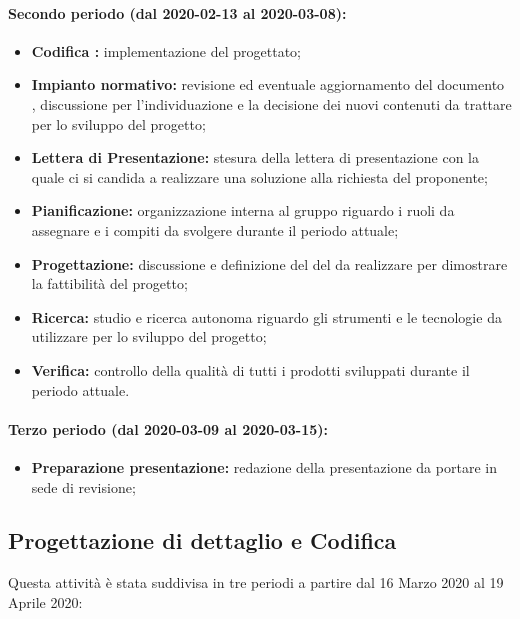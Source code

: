 			\paragraph{Secondo periodo (dal 2020-02-13 al 2020-03-08):}
				\begin{itemize}
					\item \textbf{Codifica :} implementazione del  progettato;
					\item \textbf{Impianto normativo:} revisione ed eventuale aggiornamento del documento , discussione per l'individuazione e la decisione dei nuovi contenuti da trattare per lo sviluppo del progetto;
					\item \textbf{Lettera di Presentazione:} stesura della lettera di presentazione con la quale ci si candida a realizzare una soluzione alla richiesta del proponente;
					\item \textbf{Pianificazione:} organizzazione interna al gruppo riguardo i ruoli da assegnare e i compiti da svolgere durante il periodo attuale;
					\item \textbf{Progettazione:} discussione e definizione del  del  da realizzare per dimostrare la fattibilità del progetto;
					\item \textbf{Ricerca:} studio e ricerca autonoma riguardo gli strumenti e le tecnologie da utilizzare per lo sviluppo del progetto;
					\item \textbf{Verifica:} controllo della qualità di tutti i prodotti sviluppati durante il periodo attuale.
				\end{itemize}
	
			\paragraph{Terzo periodo (dal 2020-03-09 al 2020-03-15):}
				\begin{itemize}
					\item \textbf{Preparazione presentazione:} redazione della presentazione da portare in sede di revisione;
				\end{itemize}

	\subsection{Progettazione di dettaglio e Codifica}
	Questa attività è stata suddivisa in tre periodi a partire dal 16 Marzo 2020 al 19 Aprile 2020:


